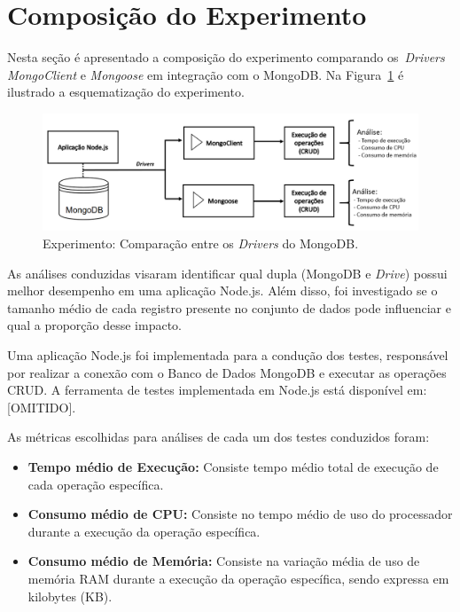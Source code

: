 \documentclass[12pt]{article}
\begin{document}
\section{Composição do Experimento}
\label{section:experimento}

Nesta seção é apresentado a composição do experimento comparando os~\emph{Drivers} \emph{MongoClient} e \emph{Mongoose} em integração com o MongoDB. 
Na Figura~\ref{figure:diagrama-banco} é ilustrado a esquematização do experimento. 

\begin{figure}[!ht]
    \centering
    \includegraphics[width=\textwidth]{images/esquema-experimento.png}
    \caption{Experimento: Comparação entre os \emph{Drivers} do MongoDB.}
    \label{figure:diagrama-banco}
\end{figure}
 
As análises conduzidas visaram identificar qual dupla (MongoDB e \emph{Drive}) possui melhor desempenho em uma aplicação Node.js. 
Além disso, foi investigado se o tamanho médio de cada registro presente no conjunto de dados pode influenciar e qual a proporção desse impacto.

Uma aplicação Node.js foi implementada para a condução dos testes, responsável por realizar a conexão com o Banco de Dados MongoDB e executar as operações CRUD. A ferramenta de testes implementada em Node.js está disponível em: [OMITIDO].%

As métricas escolhidas para análises de cada um dos testes conduzidos foram:

\begin{itemize}
\item \textbf{Tempo médio de Execução:} Consiste tempo médio total de execução de cada operação específica.
\item \textbf{Consumo médio de CPU:} Consiste no tempo médio de uso do processador durante a execução da operação específica.
\item \textbf{Consumo médio de Memória:} Consiste na variação média de uso de memória RAM durante a execução da operação específica, sendo expressa em kilobytes (KB).
\end{itemize}
\end{document}
